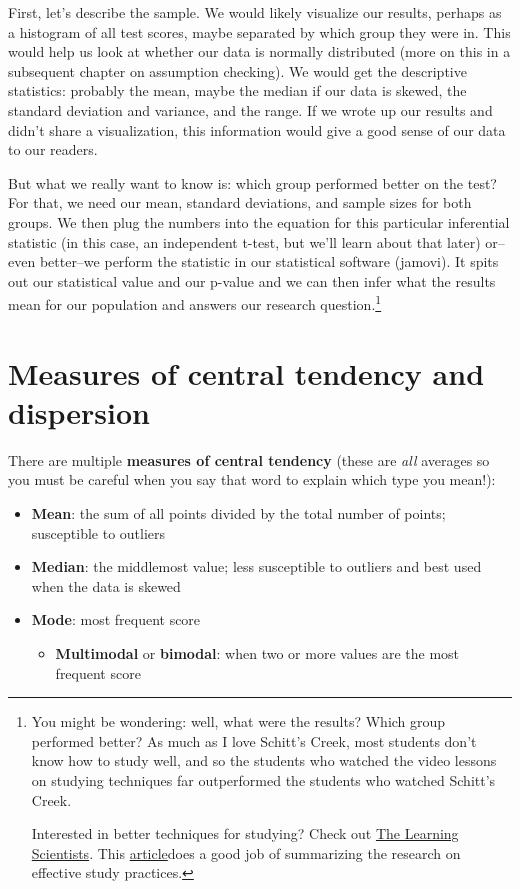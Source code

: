 \documentclass[
]{book}
\providecommand{\tightlist}{%
  \setlength{\itemsep}{0pt}\setlength{\parskip}{0pt}}
\begin{document}
First, let's describe the sample. We would likely visualize our results, perhaps as a histogram of all test scores, maybe separated by which group they were in. This would help us look at whether our data is normally distributed (more on this in a subsequent chapter on assumption checking). We would get the descriptive statistics: probably the mean, maybe the median if our data is skewed, the standard deviation and variance, and the range. If we wrote up our results and didn't share a visualization, this information would give a good sense of our data to our readers.

But what we really want to know is: which group performed better on the test? For that, we need our mean, standard deviations, and sample sizes for both groups. We then plug the numbers into the equation for this particular inferential statistic (in this case, an independent t-test, but we'll learn about that later) or--even better--we perform the statistic in our statistical software (jamovi). It spits out our statistical value and our p-value and we can then infer what the results mean for our population and answers our research question.\footnote{You might be wondering: well, what were the results? Which group performed better? As much as I love Schitt's Creek, most students don't know how to study well, and so the students who watched the video lessons on studying techniques far outperformed the students who watched Schitt's Creek.

  Interested in better techniques for studying? Check out \href{https://www.learningscientists.org/blog/category/For+Students}{The Learning Scientists}. This \href{https://www.learningscientists.org/blog/2020/1/9-1}{article}does a good job of summarizing the research on effective study practices.}

\hypertarget{measures-of-central-tendency-and-dispersion}{%
\section{Measures of central tendency and dispersion}\label{measures-of-central-tendency-and-dispersion}}

There are multiple \textbf{measures of central tendency} (these are \emph{all} averages so you must be careful when you say that word to explain which type you mean!):

\begin{itemize}
\item
  \textbf{Mean}: the sum of all points divided by the total number of points; susceptible to outliers
\item
  \textbf{Median}: the middlemost value; less susceptible to outliers and best used when the data is skewed
\item
  \textbf{Mode}: most frequent score

  \begin{itemize}
  \tightlist
  \item
    \textbf{Multimodal} or \textbf{bimodal}: when two or more values are the most frequent score
  \end{itemize}
\end{itemize}
\end{document}
